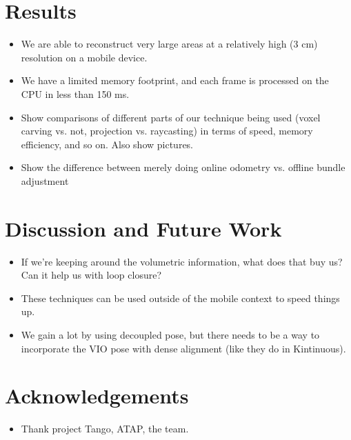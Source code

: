 \documentclass[conference,10pt]{IEEEtran}
\begin{document}
\section{Results}
\begin{itemize}
    \item We are able to reconstruct very large areas at a relatively high (3
    cm) resolution on a mobile device.
    \item We have a limited memory footprint, and each frame is processed on
    the CPU in less than 150 ms.
    \item Show comparisons of different parts of our technique being used
    (voxel carving vs. not, projection vs. raycasting) in terms of speed, memory
    efficiency, and so on. Also show pictures.
    \item Show the difference between merely doing online odometry vs. offline
    bundle adjustment
\end{itemize}

\section{Discussion and Future Work}
\begin{itemize}
    \item If we're keeping around the volumetric information, what does that buy
    us? Can it help us with loop closure?
    \item These techniques can be used outside of the mobile context to speed
    things up.
    \item We gain a lot by using decoupled pose, but there needs to be a way to
    incorporate the VIO pose with dense alignment (like they do in Kintinuous).
\end{itemize}

\section{Acknowledgements}
\begin{itemize}
    \item Thank project Tango, ATAP, the team.
\end{itemize}


 
\end{document}
